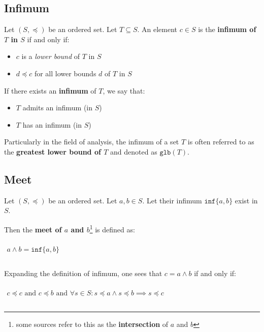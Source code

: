 \subsection{Infimum}
\label{sec:infimum}

Let $(S, \preceq)$ be an ordered set. Let $T \subseteq S$. An element
$c \in S$ is the \textbf{infimum of $T$ in $S$} if and only if:

\begin{itemize}
\item $c$ is a \textit{lower bound} of $T$ in $S$
\item $d \preceq c$ for all lower bounds $d$ of $T$ in $S$
\end{itemize}

If there exists an \textbf{infimum} of $T$, we say that:

\begin{itemize}
\item $T$ admits an infimum (in $S$)
\item $T$ has an infimum (in $S$)
\end{itemize}


Particularly in the field of analysis, the infimum of a set $T$ is
often referred to as the \textbf{greatest lower bound of $T$} and
denoted as $\mathtt{glb}(T)$.


\subsection{Meet}
\label{sec:meet}

Let $(S, \preceq)$ be an ordered set. Let $a, b \in S$. Let their
infimum $\mathtt{inf} \{a, b\}$ exist in $S$.

Then the \textbf{meet of $a$ and $b$}\footnote{some sources refer to
  this as the \textbf{intersection} of $a$ and $b$} is defined as:

\begin{math}
  \begin{array}{c}
    \\
    a \wedge b =\mathtt{inf} \{ a, b \}\\
    \\
  \end{array}
\end{math}


Expanding the definition of infimum, one sees that $c = a \wedge b$ if
and only if:

\begin{math}
  \begin{array}{c}
    \\
    c \preceq c\text{ and }c \preceq b\text{ and } \forall s \in S: s \preceq a \land s \preceq b \implies s \preceq c\\
    \\
  \end{array}
\end{math}


